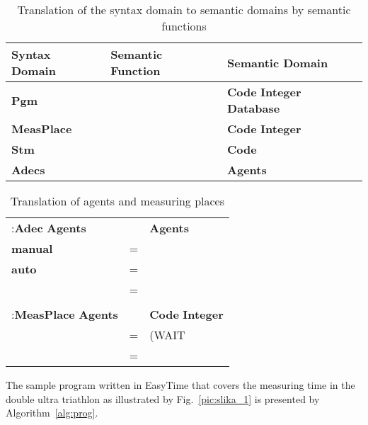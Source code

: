 \documentclass[preprint, prX]{revtex4}
\begin{document}
\begin{table}[htb]        \caption{Translation of the syntax domain to semantic domains by semantic functions}
\label{tab:Z}
\vspace{-5mm}
\begin{center}
\begin{tabular}{ | l  l  l | }
\hline
 Syntax Domain & Semantic Function & Semantic Domain \\
\hline
 \textbf{Pgm} &  & \textbf{Code}  \textbf{Integer}  \textbf{Database} \\
 \textbf{MeasPlace} &  & \textbf{Code}  \textbf{Integer} \\
 \textbf{Stm} &  & \textbf{Code} \\
 \textbf{Adecs} &  & \textbf{Agents} \\
\hline
\end{tabular}
\end{center}
\vspace{-5mm}
\end{table}

\begin{table}[htb]
\caption{Translation of agents and measuring places}
\label{tab:tab6}
\vspace{-5mm}
\begin{center}
\begin{tabular}{ | l  l  l | }
\hline
  :\textbf{Adec}  \textbf{Agents} &  & \textbf{Agents} \\
   \textbf{manual}  & = &  \\
   \textbf{auto}  & = &  \\
   & = &  \\
  & & \\
  :\textbf{MeasPlace}  \textbf{Agents}&&\textbf{Code}  \textbf{Integer} \\
  &=&(WAIT   \\
  &=& \\
\hline
\end{tabular}
\end{center}
\vspace{-5mm}
\end{table}

The sample program written in EasyTime that covers the measuring time in the double ultra triathlon as illustrated by
Fig.~\ref{pic:slika_1} is presented by Algorithm~\ref{alg:prog}.
\end{document}

